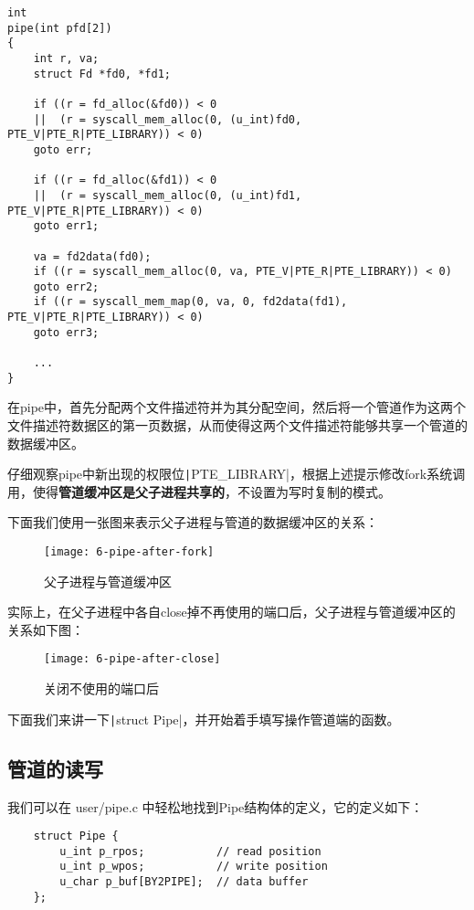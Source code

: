 \begin{verbatim}
int
pipe(int pfd[2])
{
	int r, va;
	struct Fd *fd0, *fd1;
	
	if ((r = fd_alloc(&fd0)) < 0
	||  (r = syscall_mem_alloc(0, (u_int)fd0, PTE_V|PTE_R|PTE_LIBRARY)) < 0)
	goto err;
	
	if ((r = fd_alloc(&fd1)) < 0
	||  (r = syscall_mem_alloc(0, (u_int)fd1, PTE_V|PTE_R|PTE_LIBRARY)) < 0)
	goto err1;
	
	va = fd2data(fd0);
	if ((r = syscall_mem_alloc(0, va, PTE_V|PTE_R|PTE_LIBRARY)) < 0)
	goto err2;
	if ((r = syscall_mem_map(0, va, 0, fd2data(fd1), PTE_V|PTE_R|PTE_LIBRARY)) < 0)
	goto err3;
	
	...
}
\end{verbatim}

在pipe中，首先分配两个文件描述符并为其分配空间，然后将一个管道作为这两个文件描述符数据区的第一页数据，从而使得这两个文件描述符能够共享一个管道的数据缓冲区。

\begin{exercise}
	仔细观察pipe中新出现的权限位\texttt|PTE_LIBRARY|，根据上述提示修改fork系统调用，使得\textbf{管道缓冲区是父子进程共享的}，不设置为写时复制的模式。
\end{exercise}

下面我们使用一张图来表示父子进程与管道的数据缓冲区的关系：

\begin{figure}[htbp]
	\centering
	\texttt{[image: 6-pipe-after-fork]}
	\caption{父子进程与管道缓冲区}\label{fig:6-pipe-after-fork} 
\end{figure}

实际上，在父子进程中各自close掉不再使用的端口后，父子进程与管道缓冲区的关系如下图：

\begin{figure}[htbp]
	\centering
	\texttt{[image: 6-pipe-after-close]}
	\caption{关闭不使用的端口后}\label{fig:6-pipe-after-close} 
\end{figure}

下面我们来讲一下\texttt|struct Pipe|，并开始着手填写操作管道端的函数。

\subsection{管道的读写}

我们可以在 user/pipe.c 中轻松地找到Pipe结构体的定义，它的定义如下：

\begin{verbatim}
	struct Pipe {
		u_int p_rpos;		    // read position
		u_int p_wpos;		    // write position
		u_char p_buf[BY2PIPE];	// data buffer
	};
\end{verbatim}


